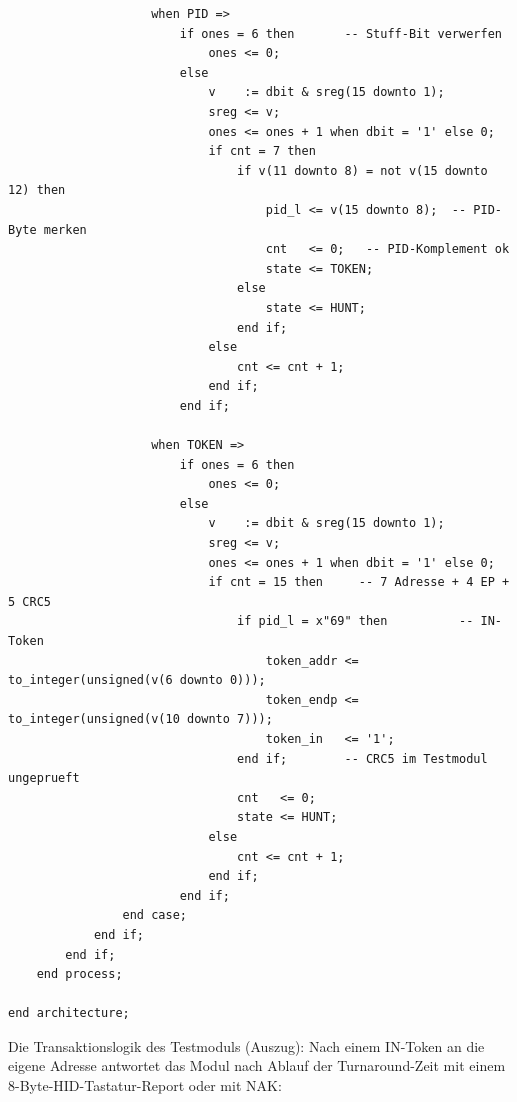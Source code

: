 \documentclass[a4paper,11pt]{article}
\begin{document}
\begin{verbatim}
                    when PID =>
                        if ones = 6 then       -- Stuff-Bit verwerfen
                            ones <= 0;
                        else
                            v    := dbit & sreg(15 downto 1);
                            sreg <= v;
                            ones <= ones + 1 when dbit = '1' else 0;
                            if cnt = 7 then
                                if v(11 downto 8) = not v(15 downto 12) then
                                    pid_l <= v(15 downto 8);  -- PID-Byte merken
                                    cnt   <= 0;   -- PID-Komplement ok
                                    state <= TOKEN;
                                else
                                    state <= HUNT;
                                end if;
                            else
                                cnt <= cnt + 1;
                            end if;
                        end if;

                    when TOKEN =>
                        if ones = 6 then
                            ones <= 0;
                        else
                            v    := dbit & sreg(15 downto 1);
                            sreg <= v;
                            ones <= ones + 1 when dbit = '1' else 0;
                            if cnt = 15 then     -- 7 Adresse + 4 EP + 5 CRC5
                                if pid_l = x"69" then          -- IN-Token
                                    token_addr <= to_integer(unsigned(v(6 downto 0)));
                                    token_endp <= to_integer(unsigned(v(10 downto 7)));
                                    token_in   <= '1';
                                end if;        -- CRC5 im Testmodul ungeprueft
                                cnt   <= 0;
                                state <= HUNT;
                            else
                                cnt <= cnt + 1;
                            end if;
                        end if;
                end case;
            end if;
        end if;
    end process;

end architecture;
\end{verbatim}

Die Transaktionslogik des Testmoduls (Auszug): Nach einem IN-Token an die eigene Adresse antwortet das Modul nach Ablauf der Turnaround-Zeit mit einem 8-Byte-HID-Tastatur-Report oder mit NAK:
\end{document}
